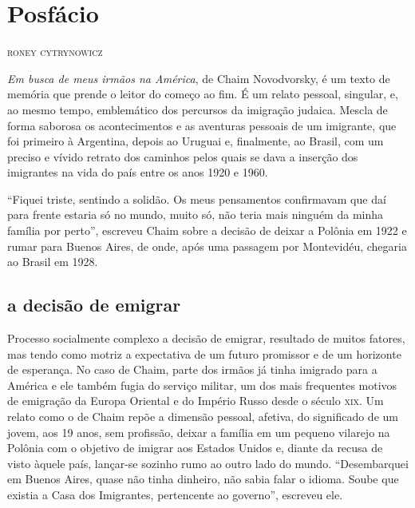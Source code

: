 \chapter*{Posfácio\smallskip{}}

\begin{flushright}
\textsc{roney cytrynowicz}
\end{flushright}\medskip

\noindent{}\textit{Em busca de meus irmãos na América}, de Chaim
Novodvorsky, é um texto de memória que prende o leitor do começo ao fim.
É um relato pessoal, singular, e, ao mesmo tempo, emblemático dos
percursos da imigração judaica. Mescla de forma saborosa os
acontecimentos e as aventuras pessoais de um imigrante, que foi primeiro
à Argentina, depois ao Uruguai e, finalmente, ao Brasil, com um preciso
e vívido retrato dos caminhos pelos quais se dava a inserção dos
imigrantes na vida do país entre os anos 1920 e 1960.

``Fiquei triste, sentindo a solidão. Os meus pensamentos confirmavam que
daí para frente estaria só no mundo, muito só, não teria mais ninguém da
minha família por perto'', escreveu Chaim sobre a decisão de deixar a
Polônia em 1922 e rumar para Buenos Aires, de onde, após uma passagem
por Montevidéu, chegaria ao Brasil em 1928. 

\section{a decisão de emigrar}

Processo socialmente complexo a decisão de emigrar, resultado de muitos fatores, mas tendo
como motriz a expectativa de um futuro promissor e de um horizonte de
esperança. No caso de Chaim, parte dos irmãos já tinha imigrado para a
América e ele também fugia do serviço militar, um dos mais frequentes
motivos de emigração da Europa Oriental e do Império Russo desde o
século \textsc{xix}. Um relato como o de Chaim repõe a dimensão pessoal, afetiva, do
significado de um jovem, aos 19 anos, sem profissão, deixar a família em
um pequeno vilarejo na Polônia com o objetivo de imigrar aos Estados
Unidos e, diante da recusa de visto àquele país, lançar-se sozinho rumo
ao outro lado do mundo. ``Desembarquei em Buenos Aires, quase não tinha
dinheiro, não sabia falar o idioma. Soube que existia a Casa dos
Imigrantes, pertencente ao governo'', escreveu ele.

